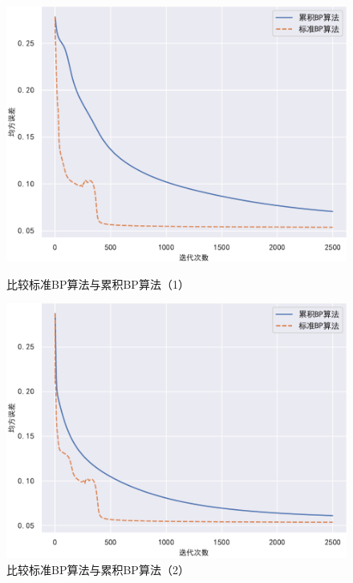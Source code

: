 \documentclass{ctexart}
\begin{document}
	\begin{figure}[!htb]
		\centering
		\begin{minipage}{0.49\linewidth}
			\centering
			\includegraphics[width=\textwidth]{../image/比较1.pdf}
			\caption{比较标准BP算法与累积BP算法（1）}
			\label{比较1}%
		\end{minipage}
		\begin{minipage}{0.49\linewidth}
			\centering
			\includegraphics[width=\textwidth]{../image/比较2.pdf}
			\caption{比较标准BP算法与累积BP算法（2）}
			\label{比较2}%
		\end{minipage}
		

\end{figure}
\end{document}
